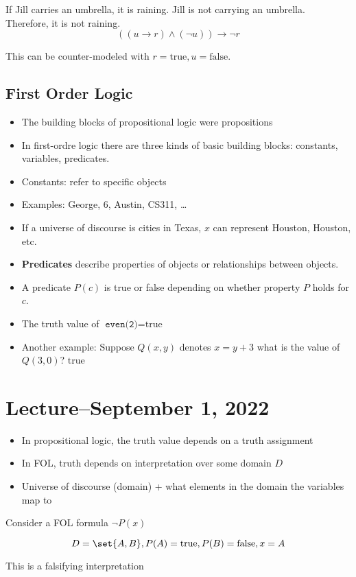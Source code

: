 \documentclass[8pt]{scrreprt}
\newcommand{\true}{\text{true}}
\newcommand{\false}{\text{false}}
\begin{document}
\begin{example}
	If Jill carries an umbrella, it is raining. Jill is not carrying an umbrella. Therefore, it is not raining.
	\[
		((u\rightarrow r)\land (\neg u))\rightarrow \neg r
	\]

	This can be counter-modeled with $r=\true, u=\false$.
\end{example}

\subsection{First Order Logic}
\begin{itemize}
	\item The building blocks of propositional logic were propositions
	\item In first-ordre logic there are three kinds of basic building blocks:
	      constants, variables, predicates.
	\item Constants: refer to specific objects
	\item Examples: George, 6, Austin, CS311, \ldots
	\item If a universe of discourse is cities in Texas, $x$ can represent Houston,
	      Houston, etc.
	\item \textbf{Predicates} describe properties of objects or relationships between objects.
	\item A predicate $P(c)$ is true or false depending on whether property
	      $P$ holds for $c$.
	\item The truth value of $\texttt{even(2)} = \true$
	\item Another example: Suppose $Q(x, y)$ denotes $x=y+3$ what is the value of
	      $Q(3, 0)$? $\true$
\end{itemize}

\section{Lecture--September 1, 2022}
\begin{itemize}
	\item In propositional logic, the truth value depends on a truth assignment
	\item In FOL, truth depends on interpretation over some domain $D$
	\item Universe of discourse (domain) + what elements in the domain the variables map to
\end{itemize}

\begin{example}
	Consider a FOL formula $\neg P(x)$

	\[D=\set{A, B}, P(A)=\true, P(B)=\false, x=A\]

	This is a falsifying interpretation
\end{example}
\end{document}
